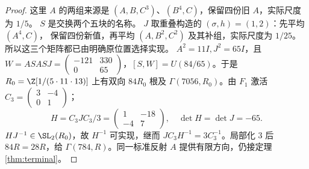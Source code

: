 \begin{proof}
这里 $A$ 的两组来源是 $(A,B,C^3)$、$(B^4,C)$，保留四份旧 $A$，实际尺度为 $1/5$。
$S$ 是交换两个五块的名称。
$J$ 取重叠构造的 $(\sigma,h)=(1,2)$：先平均 $(A^4,C)$，
保留四份新值，再平均 $(A,B^2,C^2)$ 及其补组，实际尺度为 $1/25$。
所以这三个矩阵都已由明确原位置选择实现。
$A^2=11I,J^2=65I$，且 $W=ASASJ=\left(\begin{smallmatrix}-121&330\\0&65\end{smallmatrix}\right)$，$[S,W]=U(84/65)$。于是 $R_0=\Z[1/(5\cdot11\cdot13)]$ 上有双向 $84R_0$ 根及 $\Gamma(7056,R_0)$。由 $F_1$ 激活 $C_3=\left(\begin{smallmatrix}3&-4\\0&1\end{smallmatrix}\right)$；
\[
H=C_3JC_3/3=\begin{pmatrix}1&-18\\-4&7\end{pmatrix},\quad
\det H=\det J=-65.
\]
$HJ^{-1}\in\SL_2(R_0)$，故 $H^{-1}$ 可实现，继而 $JC_3H^{-1}=3C_3^{-1}$。局部化 $3$ 后 $84R=28R$，给 $\Gamma(784,R)$。同一标准反射 $A$ 提供有限方向，仍接定理\ref{thm:terminal}。
\end{proof}

